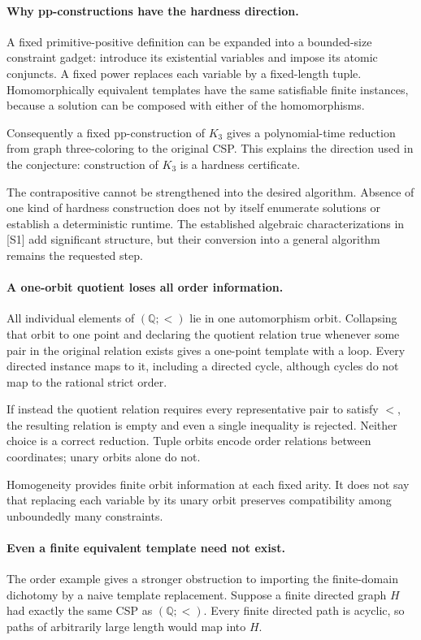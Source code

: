 \documentclass[11pt]{article}
\begin{document}
\paragraph{Why pp-constructions have the hardness direction.}
A fixed primitive-positive definition can be expanded into a bounded-size constraint gadget: introduce its existential variables and impose its atomic conjuncts. A fixed power replaces each variable by a fixed-length tuple. Homomorphically equivalent templates have the same satisfiable finite instances, because a solution can be composed with either of the homomorphisms.

Consequently a fixed pp-construction of $K_3$ gives a polynomial-time reduction from graph three-coloring to the original CSP. This explains the direction used in the conjecture: construction of $K_3$ is a hardness certificate.

The contrapositive cannot be strengthened into the desired algorithm. Absence of one kind of hardness construction does not by itself enumerate solutions or establish a deterministic runtime. The established algebraic characterizations in [S1] add significant structure, but their conversion into a general algorithm remains the requested step.

\paragraph{A one-orbit quotient loses all order information.}
All individual elements of $(\mathbb Q;<)$ lie in one automorphism orbit. Collapsing that orbit to one point and declaring the quotient relation true whenever some pair in the original relation exists gives a one-point template with a loop. Every directed instance maps to it, including a directed cycle, although cycles do not map to the rational strict order.

If instead the quotient relation requires every representative pair to satisfy $<$, the resulting relation is empty and even a single inequality is rejected. Neither choice is a correct reduction. Tuple orbits encode order relations between coordinates; unary orbits alone do not.

Homogeneity provides finite orbit information at each fixed arity. It does not say that replacing each variable by its unary orbit preserves compatibility among unboundedly many constraints.

\paragraph{Even a finite equivalent template need not exist.}
The order example gives a stronger obstruction to importing the finite-domain dichotomy by a naive template replacement. Suppose a finite directed graph $H$ had exactly the same CSP as $(\mathbb Q;<)$. Every finite directed path is acyclic, so paths of arbitrarily large length would map into $H$.
\end{document}
